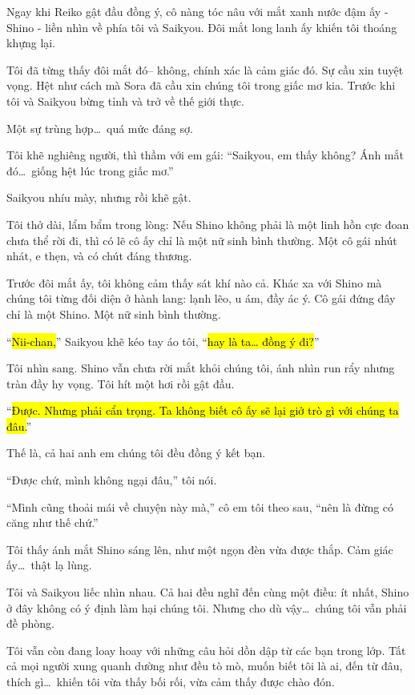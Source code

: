 \documentclass[../main.tex]{subfiles}
\begin{document}
Ngay khi Reiko gật đầu đồng ý, cô nàng tóc nâu với mắt xanh nước đậm ấy - Shino - liền nhìn về phía tôi và Saikyou. Đôi mắt long lanh ấy khiến tôi thoáng khựng lại.

Tôi đã từng thấy đôi mắt đó-- không, chính xác là cảm giác đó. Sự cầu xin tuyệt vọng. Hệt như cách mà Sora đã cầu xin chúng tôi trong giấc mơ kia. Trước khi tôi và Saikyou bừng tỉnh và trở về thế giới thực.

Một sự trùng hợp\dots\ quá mức đáng sợ.

Tôi khẽ nghiêng người, thì thầm với em gái:
``Saikyou, em thấy không? Ánh mắt đó\dots\ giống hệt lúc trong giấc mơ.''

Saikyou nhíu mày, nhưng rồi khẽ gật.

Tôi thở dài, lẩm bẩm trong lòng: Nếu Shino không phải là một linh hồn cực đoan chưa thể rời đi, thì có lẽ cô ấy chỉ là một nữ sinh bình thường. Một cô gái nhút nhát, e thẹn, và có chút đáng thương.

Trước đôi mắt ấy, tôi không cảm thấy sát khí nào cả. Khác xa với Shino mà chúng tôi từng đối diện ở hành lang: lạnh lẽo, u ám, đầy ác ý. Cô gái đứng đây chỉ là một Shino. Một nữ sinh bình thường.

``\hl{Nii-chan,}'' Saikyou khẽ kéo tay áo tôi, ``\hl{hay là ta\dots{} đồng ý đi?}''

Tôi nhìn sang. Shino vẫn chưa rời mắt khỏi chúng tôi, ánh nhìn run rẩy nhưng tràn đầy hy vọng. Tôi hít một hơi rồi gật đầu.

``\hl{Được. Nhưng phải cẩn trọng. Ta không biết cô ấy sẽ lại giở trò gì với chúng ta đâu.}''

Thế là, cả hai anh em chúng tôi đều đồng ý kết bạn.

``Được chứ, mình không ngại đâu,'' tôi nói.

``Mình cũng thoải mái về chuyện này mà,'' cô em tôi theo sau, ``nên là đừng có căng như thế chứ.''

Tôi thấy ánh mắt Shino sáng lên, như một ngọn đèn vừa được thắp. Cảm giác ấy\dots\ thật lạ lùng.

Tôi và Saikyou liếc nhìn nhau. Cả hai đều nghĩ đến cùng một điều: ít nhất, Shino ở đây không có ý định làm hại chúng tôi. Nhưng cho dù vậy\dots\ chúng tôi vẫn phải đề phòng.


Tôi vẫn còn đang loay hoay với những câu hỏi dồn dập từ các bạn trong lớp. Tất cả mọi người xung quanh dường như đều tò mò, muốn biết tôi là ai, đến từ đâu, thích gì\dots\ khiến tôi vừa thấy bối rối, vừa cảm thấy được chào đón.
\end{document}
